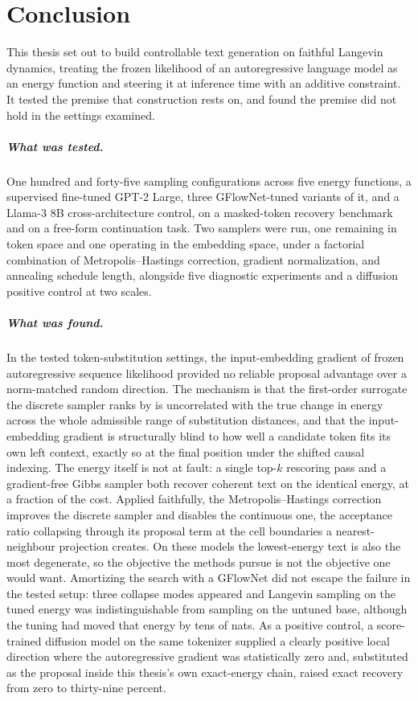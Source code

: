 \chapter{Conclusion}
\label{ch:conclusion}

This thesis set out to build controllable text generation on faithful Langevin dynamics, treating the frozen likelihood of an autoregressive language model as an energy function and steering it at inference time with an additive constraint. It tested the premise that construction rests on, and found the premise did not hold in the settings examined.

\paragraph*{What was tested.} One hundred and forty-five sampling configurations across five energy functions, a supervised fine-tuned GPT-2 Large, three GFlowNet-tuned variants of it, and a Llama-3 8B cross-architecture control, on a masked-token recovery benchmark and on a free-form continuation task. Two samplers were run, one remaining in token space and one operating in the embedding space, under a factorial combination of Metropolis--Hastings correction, gradient normalization, and annealing schedule length, alongside five diagnostic experiments and a diffusion positive control at two scales.

\paragraph*{What was found.} In the tested token-substitution settings, the input-embedding gradient of frozen autoregressive sequence likelihood provided no reliable proposal advantage over a norm-matched random direction. The mechanism is that the first-order surrogate the discrete sampler ranks by is uncorrelated with the true change in energy across the whole admissible range of substitution distances, and that the input-embedding gradient is structurally blind to how well a candidate token fits its own left context, exactly so at the final position under the shifted causal indexing. The energy itself is not at fault: a single top-$k$ rescoring pass and a gradient-free Gibbs sampler both recover coherent text on the identical energy, at a fraction of the cost. Applied faithfully, the Metropolis--Hastings correction improves the discrete sampler and disables the continuous one, the acceptance ratio collapsing through its proposal term at the cell boundaries a nearest-neighbour projection creates. On these models the lowest-energy text is also the most degenerate, so the objective the methods pursue is not the objective one would want. Amortizing the search with a GFlowNet did not escape the failure in the tested setup: three collapse modes appeared and Langevin sampling on the tuned energy was indistinguishable from sampling on the untuned base, although the tuning had moved that energy by tens of nats. As a positive control, a score-trained diffusion model on the same tokenizer supplied a clearly positive local direction where the autoregressive gradient was statistically zero and, substituted as the proposal inside this thesis's own exact-energy chain, raised exact recovery from zero to thirty-nine percent.

